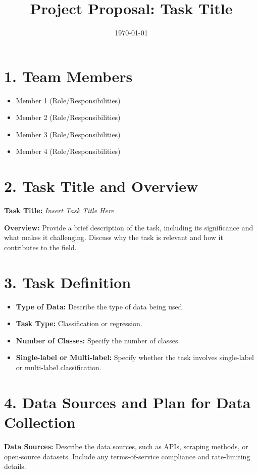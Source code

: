 \documentclass{article}
\title{Project Proposal: Task Title}
\date{\today}
\begin{document}
\maketitle

\section*{1. Team Members}
\begin{itemize}
    \item Member 1 (Role/Responsibilities)
    \item Member 2 (Role/Responsibilities)
    \item Member 3 (Role/Responsibilities)
    \item Member 4 (Role/Responsibilities)
\end{itemize}

\section*{2. Task Title and Overview}
\textbf{Task Title:} \textit{Insert Task Title Here}

\textbf{Overview:}  
Provide a brief description of the task, including its significance and what makes it challenging. Discuss why the task is relevant and how it contributes to the field.

\section*{3. Task Definition}
\begin{itemize}
    \item \textbf{Type of Data:} Describe the type of data being used.
    \item \textbf{Task Type:} Classification or regression.
    \item \textbf{Number of Classes:} Specify the number of classes.
    \item \textbf{Single-label or Multi-label:} Specify whether the task involves single-label or multi-label classification.
\end{itemize}

\section*{4. Data Sources and Plan for Data Collection}
\textbf{Data Sources:} Describe the data sources, such as APIs, scraping methods, or open-source datasets. Include any terms-of-service compliance and rate-limiting details.
\end{document}
